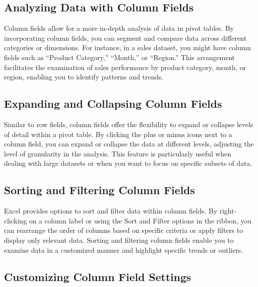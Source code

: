 \documentclass[
]{book}
\begin{document}
\hypertarget{analyzing-data-with-column-fields}{%
\subsection{Analyzing Data with Column Fields}\label{analyzing-data-with-column-fields}}

Column fields allow for a more in-depth analysis of data in pivot tables. By incorporating column fields, you can segment and compare data across different categories or dimensions. For instance, in a sales dataset, you might have column fields such as ``Product Category,'' ``Month,'' or ``Region.'' This arrangement facilitates the examination of sales performance by product category, month, or region, enabling you to identify patterns and trends.

\hypertarget{expanding-and-collapsing-column-fields}{%
\subsection{Expanding and Collapsing Column Fields}\label{expanding-and-collapsing-column-fields}}

Similar to row fields, column fields offer the flexibility to expand or collapse levels of detail within a pivot table. By clicking the plus or minus icons next to a column field, you can expand or collapse the data at different levels, adjusting the level of granularity in the analysis. This feature is particularly useful when dealing with large datasets or when you want to focus on specific subsets of data.

\hypertarget{sorting-and-filtering-column-fields}{%
\subsection{Sorting and Filtering Column Fields}\label{sorting-and-filtering-column-fields}}

Excel provides options to sort and filter data within column fields. By right-clicking on a column label or using the Sort and Filter options in the ribbon, you can rearrange the order of columns based on specific criteria or apply filters to display only relevant data. Sorting and filtering column fields enable you to examine data in a customized manner and highlight specific trends or outliers.

\hypertarget{customizing-column-field-settings}{%
\subsection{Customizing Column Field Settings}\label{customizing-column-field-settings}}
\end{document}
